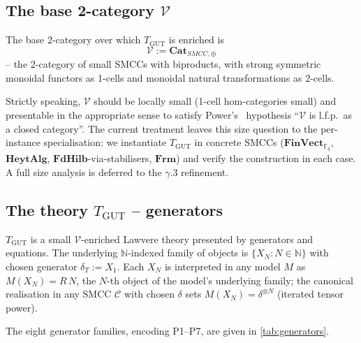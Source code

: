 \documentclass[11pt,a4paper]{article}
\theoremstyle{plain}
\theoremstyle{definition}
\theoremstyle{remark}
\newcommand{\F}{\mathbb{F}}
\newcommand{\N}{\mathbb{N}}
\newcommand{\cat}[1]{\mathbf{#1}}
\newcommand{\HeytAlg}{\cat{HeytAlg}}
\newcommand{\FdHilb}{\cat{FdHilb}}
\newcommand{\Frm}{\cat{Frm}}
\newcommand{\FinVect}{\cat{FinVect}}
\newcommand{\TGUT}{T_{\mathrm{GUT}}}
\newcommand{\smcc}{SMCC}
\begin{document}
\subsection{The base 2-category $\mathcal{V}$}\label{sec:tgut:V}

The base 2-category over which $\TGUT$ is enriched is
\[
\mathcal{V} := \cat{Cat}_{\smcc,\oplus}
\]
-- the 2-category of small \smcc{}s with biproducts, with strong symmetric monoidal functors as 1-cells and monoidal natural transformations as 2-cells.

Strictly speaking, $\mathcal{V}$ should be locally small (1-cell hom-categories small) and presentable in the appropriate sense to satisfy Power's~\cite{Pow99} hypothesis ``$\mathcal{V}$ is l.f.p.\ as a closed category''. The current treatment leaves this size question to the per-instance specialisation: we instantiate $\TGUT$ in concrete \smcc{}s ($\FinVect_{\F_q}$, $\HeytAlg$, $\FdHilb$-via-stabilisers, $\Frm$) and verify the construction in each case. A full size analysis is deferred to the $\gamma$.3 refinement.

\subsection{The theory $\TGUT$ -- generators}\label{sec:tgut:gens}

$\TGUT$ is a small $\mathcal{V}$-enriched Lawvere theory presented by generators and equations. The underlying $\N$-indexed family of objects is $\{X_N : N \in \N\}$ with chosen generator $\delta_T := X_1$. Each $X_N$ is interpreted in any model $M$ as $M(X_N) = R\,N$, the $N$-th object of the model's underlying family; the canonical realisation in any \smcc{} $\mathcal{C}$ with chosen $\delta$ sets $M(X_N) = \delta^{\otimes N}$ (iterated tensor power).

The eight generator families, encoding P1--P7, are given in \cref{tab:generators}.
\end{document}
